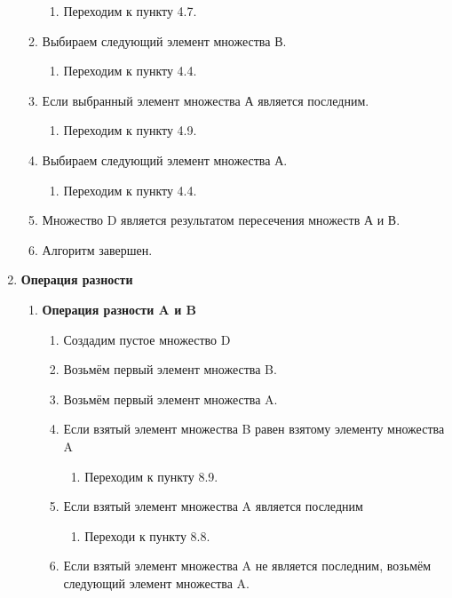 \documentclass[a4paper,12pt]{extarticle}
\begin{document}
\begin{enumerate}
\begin{enumerate}[label*=\arabic*.]
    \begin{enumerate}[label*=\arabic*.]
      \item Переходим к пункту 4.7.
    \end{enumerate}
    \item Выбираем следующий элемент множества В.
    \begin{enumerate}[label*=\arabic*.]
      \item Переходим к пункту 4.4.
    \end{enumerate}
    \item Если выбранный элемент множества А является последним.
    \begin{enumerate}[label*=\arabic*.]
      \item Переходим к пункту 4.9.
    \end{enumerate}
    \item Выбираем следующий элемент множества А.
    \begin{enumerate}[label*=\arabic*.]
      \item Переходим к пункту 4.4.
    \end{enumerate}
    \item Множество D является результатом пересечения множеств А и В.
    \item Алгоритм завершен.
  \end{enumerate}
  \item \textbf{Операция разности}
  \begin{enumerate}[label*=\arabic*.]
  \item \textbf{Операция разности A и B}
  \begin{enumerate}[label*=\arabic*.]
    \item Создадим пустое множество D
    \item Возьмём первый элемент множества B.
    \item Возьмём первый элемент множества A.
    \item Если взятый элемент множества B равен взятому элементу множества A
    \begin{enumerate}[label*=\arabic*.]
      \item Переходим к пункту 8.9.
    \end{enumerate}
    \item Если взятый элемент множества A является последним
    \begin{enumerate}[label*=\arabic*.]
      \item Переходи к пункту 8.8.
    \end{enumerate}
    \item Если взятый элемент множества A не является последним, возьмём следующий элемент множества A.

\end{enumerate}
\end{enumerate}
\end{enumerate}
\end{document}
